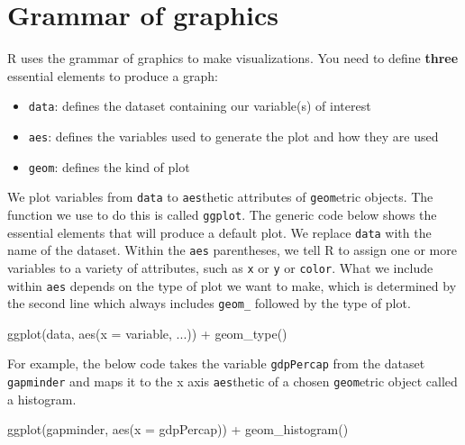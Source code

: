 \documentclass[
]{book}
\makeatletter
\newenvironment{Shaded}{\begin{snugshade}}{\end{snugshade}}
\newcommand{\AttributeTok}[1]{\textcolor[rgb]{0.61,0.61,0.61}{#1}}
\newcommand{\FunctionTok}[1]{\textcolor[rgb]{0,0,0}{#1}}
\newcommand{\NormalTok}[1]{#1}
\newcommand{\SpecialCharTok}[1]{\textcolor[rgb]{0,0,0}{#1}}
\providecommand{\tightlist}{%
  \setlength{\itemsep}{0pt}\setlength{\parskip}{0pt}}
\newenvironment{kframe}{%
\medskip{}
\setlength{\fboxsep}{.8em}
 \def\at@end@of@kframe{}%
 \ifinner\ifhmode%
  \def\at@end@of@kframe{\end{minipage}}%
  \begin{minipage}{\columnwidth}%
 \fi\fi%
 \def\FrameCommand##1{\hskip\@totalleftmargin \hskip-\fboxsep
 \colorbox{shadecolor}{##1}\hskip-\fboxsep
     \hskip-\linewidth \hskip-\@totalleftmargin \hskip\columnwidth}%
 \MakeFramed {\advance\hsize-\width
   \@totalleftmargin\z@ \linewidth\hsize
   \@setminipage}}%
 {\par\unskip\endMakeFramed%
 \at@end@of@kframe}
\renewenvironment{Shaded}{\begin{kframe}}{\end{kframe}}
\makeatother
\begin{document}
\hypertarget{grammar-of-graphics}{%
\section{Grammar of graphics}\label{grammar-of-graphics}}

R uses the grammar of graphics to make visualizations. You need to define \textbf{three} essential elements to produce a graph:

\begin{itemize}
\tightlist
\item
  \texttt{data}: defines the dataset containing our variable(s) of interest
\item
  \texttt{aes}: defines the variables used to generate the plot and how they are used
\item
  \texttt{geom}: defines the kind of plot
\end{itemize}

We plot variables from \texttt{data} to \texttt{aes}thetic attributes of \texttt{geom}etric objects. The function we use to do this is called \texttt{ggplot}. The generic code below shows the essential elements that will produce a default plot. We replace \texttt{data} with the name of the dataset. Within the \texttt{aes} parentheses, we tell R to assign one or more variables to a variety of attributes, such as \texttt{x} or \texttt{y} or \texttt{color}. What we include within \texttt{aes} depends on the type of plot we want to make, which is determined by the second line which always includes \texttt{geom\_} followed by the type of plot.

\begin{Shaded}
\begin{Highlighting}[]
\FunctionTok{ggplot}\NormalTok{(data, }\FunctionTok{aes}\NormalTok{(}\AttributeTok{x =}\NormalTok{ variable, ...)) }\SpecialCharTok{+}
  \FunctionTok{geom\_type}\NormalTok{()}
\end{Highlighting}
\end{Shaded}

For example, the below code takes the variable \texttt{gdpPercap} from the dataset \texttt{gapminder} and maps it to the x axis \texttt{aes}thetic of a chosen \texttt{geom}etric object called a histogram.

\begin{Shaded}
\begin{Highlighting}[]
\FunctionTok{ggplot}\NormalTok{(gapminder, }\FunctionTok{aes}\NormalTok{(}\AttributeTok{x =}\NormalTok{ gdpPercap)) }\SpecialCharTok{+}
  \FunctionTok{geom\_histogram}\NormalTok{()}
\end{Highlighting}
\end{Shaded}
\end{document}
